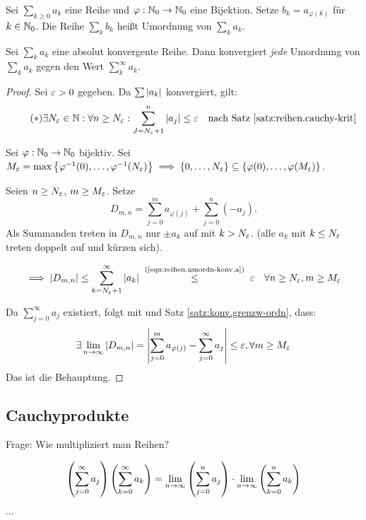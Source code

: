 \documentclass[12pt]{scrreprt}
\begin{document}
\begin{dfn}\label{dfn:reihen.umordnung}
Sei $\sum_{k\ge 0}a_k$ eine Reihe und $\varphi: \mathbb{N}_0 \rightarrow \mathbb{N}_0$ 
eine Bijektion. Setze $b_k = a_{\varphi(k)}$ für $k \in \mathbb{N}_0$. Die Reihe $\sum_k b_k$
heißt Umordnung von $\sum_k a_k$.
\end{dfn}

\begin{satz}\label{satz:reihen.umordn-konv}
Sei $\sum_k a_k$ eine absolut konvergente Reihe. Dann konvergiert \emph{jede} Umordnung von $\sum_k a_k$
gegen den Wert $\sum^\infty_k a_k$.
\end{satz}
\begin{proof}
Sei $\varepsilon > 0$ gegeben. Da $\sum \left\lvert a_k\right\lvert$ konvergiert, gilt:
\begin{equation}\label{eqn:reihen.umordn-konv.a}\tag{$*$}
\exists N_\varepsilon \in \mathbb{N}: \forall n\ge N_\varepsilon: \sum^n_{J = N_\varepsilon+1} \left\lvert a_j\right\lvert \le \varepsilon\quad \text{nach 
Satz~\ref{satz:reihen.cauchy-krit}}
\end{equation}

\noindent Sei $\varphi: \mathbb{N}_0 \rightarrow \mathbb{N}_0$ bijektiv. Sei $M_\varepsilon = \max \left\{\varphi^{-1}(0), \dotsc, \varphi^{-1}(N_\varepsilon)\right\}
\implies \left\{0, \dotsc, N_\varepsilon\right\} \subseteq \left\{\varphi(0), \dotsc, \varphi(M_\varepsilon)\right\}$.

\bigskip 

\noindent Seien $n \ge N_\varepsilon$, $m\ge M_\varepsilon$. Setze \[D_{m,n} = \sum_{j=0}^m a_{\varphi(j)} + \sum_{j=0}^n (-a_j).\]
Als Summanden treten in $D_{m,n}$ nur $\pm a_k$ auf mit $k > N_\varepsilon$. (alle $a_k$ mit $k \le N_\varepsilon$ treten doppelt
auf und kürzen sich).

\[\folgt \abs{D_{m,n}} \le \sum_{k = N_\ep +1}^\infty \abs{a_k} \nach{\le}{(\ref{eqn:reihen.umordn-konv.a})} \ep
\quad \forall n\ge N_\ep, m\ge M_\ep\]

Da $\sum_{j=0}^\infty a_j$ existiert, folgt mit \ninf{} und Satz \ref{satz:konv.grenzw-ordn}, dass:
\[\exists\lim_{n\rightarrow\infty}\left\lvert D_{m,n}\right\lvert = \left\lvert\sum_{j=0}^m a_{\varphi(j)} - \sum_{j=0}^\infty a_j\right\lvert \le \varepsilon, \forall m\ge M_\varepsilon\]
Das ist die Behauptung.
\end{proof}

\subsection*{Cauchyprodukte}
Frage: Wie multipliziert man Reihen?

\begin{equation}\label{eqn:reihen.mult-rwert}
\left(\sum_{j=0}^\infty a_j\right)\left(\sum_{k=0}^\infty a_k\right) = \lim_{n\rightarrow\infty}\left(\sum_{j=0}^n a_j\right) 
\cdot \lim_{n\rightarrow\infty}\left(\sum_{k=0}^n a_k\right)
\end{equation}
...
\end{document}
